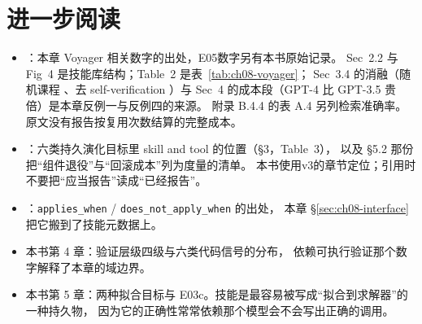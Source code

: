 \section*{进一步阅读}
\begin{itemize}
  \item \cite{voyager-2305}：本章 Voyager 相关数字的出处，E05数字另有本书原始记录。
        Sec~2.2 与 Fig~4 是技能库结构；Table~2 是表~\ref{tab:ch08-voyager}；
        Sec~3.4 的消融（随机课程 、去 self-verification ）与
        Sec~4 的成本段（GPT-4 比 GPT-3.5 贵  倍）是本章反例一与反例四的来源。
        附录 B.4.4 的表 A.4 另列检索准确率。原文没有报告按复用次数结算的完整成本。
  \item \cite{coding-survey-2608}：六类持久演化目标里 skill and tool 的位置（§3，Table~3），
        以及 §5.2 那份把``组件退役''与``回滚成本''列为度量的清单。
        本书使用v3的章节定位；引用时不要把``应当报告''读成``已经报告''。
  \item \cite{ksi-2607}：\texttt{applies\_when} / \texttt{does\_not\_apply\_when} 的出处，
        本章 §\ref{sec:ch08-interface} 把它搬到了技能元数据上。
  \item 本书第 4 章：验证层级四级与六类代码信号的分布，
         依赖可执行验证那个数字解释了本章的域边界。
  \item 本书第 5 章：两种拟合目标与 E03c。技能是最容易被写成``拟合到求解器''的一种持久物，
        因为它的正确性常常依赖那个模型会不会写出正确的调用。
\end{itemize}
